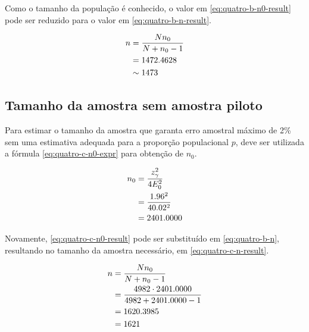 Como o tamanho da população é conhecido, o valor em \eqref{eq:quatro-b-n0-result} pode ser reduzido para o valor em \eqref{eq:quatro-b-n-result}.

\begin{align}
	n &= \frac{N n_0}{N + n_0 - 1} \nonumber \\
    &= 1472.4628 \nonumber \\
	  &\sim \label{eq:quatro-b-n-result} 
	     1473
\end{align}

\subsection{Tamanho da amostra sem amostra piloto}

Para estimar o tamanho da amostra que garanta erro amostral máximo de 2\% sem uma estimativa adequada para a proporção populacional $p$, deve ser utilizada a fórmula \eqref{eq:quatro-c-n0-expr} para obtenção de $n_0$.

\begin{align}
	n_0 &= \label{eq:quatro-c-n0-expr}
	       \frac{z_\gamma^2}{4 E_0^2} \\
	    &= \frac{1.96^2}{4 0.02^2} \nonumber \\
	    &= \label{eq:quatro-c-n0-result}
	       2401.0000
\end{align}

Novamente, \eqref{eq:quatro-c-n0-result} pode ser substituído em \eqref{eq:quatro-b-n}, resultando no tamanho da amostra necessário, em \eqref{eq:quatro-c-n-result}.

\begin{align}
	n &= \frac{N n_0}{N + n_0 - 1} \nonumber \\
	  &= \frac{4982 \cdot 2401.0000}{4982 + 2401.0000 - 1} \nonumber \\
	  &= 1620.3985 \nonumber \\
	  &= \label{eq:quatro-c-n-result} 
	     1621
\end{align}
